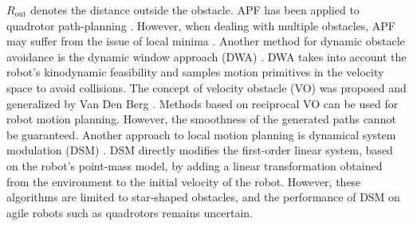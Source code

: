$R_{\text{out}}$ denotes the distance outside the obstacle. APF has been applied to quadrotor path-planning \cite{chen2016uav}. However, when dealing with multiple obstacles, APF may suffer from the issue of local minima \cite{koren1991potential}. Another method for dynamic obstacle avoidance is the dynamic window approach (DWA) \cite{seder2007dynamic}. DWA takes into account the robot's kinodynamic feasibility and samples motion primitives in the velocity space to avoid collisions. The concept of velocity obstacle (VO) was proposed and generalized by Van Den Berg \cite{van2011reciprocal,van2011reciprocal2,bareiss2013reciprocal}. Methods based on reciprocal VO can be used for robot motion planning. However, the smoothness of the generated paths cannot be guaranteed. Another approach to local motion planning is dynamical system modulation (DSM) \cite{khansari2012dynamical,huber2022fast,huber2023avoidance}. DSM directly modifies the first-order linear system, based on the robot's point-mass model, by adding a linear transformation obtained from the environment to the initial velocity of the robot. However, these algorithms are limited to star-shaped obstacles, and the performance of DSM on agile robots such as quadrotors remains uncertain.

